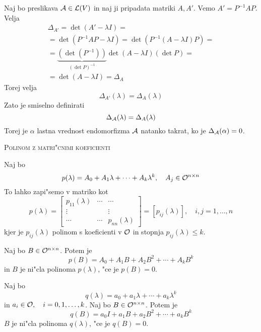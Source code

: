 Naj bo preslikava $\mathcal{A} \in \mathcal{L}(V)$ in naj ji pripadata matriki $A, A'$. Vemo $A' = P^{-1} AP$. Velja
\begin{multline*}
\Delta_{A'} = \det (A' - \lambda I) = \\
= \det (P^{-1} AP - \lambda I) = \det (P^{-1}(A - \lambda I)P) = \\
= \underbrace{(\det (P^{-1}))}_{(\det P)^{-1}} \det (A - \lambda I) (\det P) = \\
= \det (A - \lambda I) = \Delta_A
\end{multline*}
Torej velja
\begin{equation*}
\Delta_{A'}(\lambda) = \Delta_A(\lambda)
\end{equation*}
Zato je smiselno definirati
\begin{equation*}
\Delta_{\mathcal{A}}(\lambda) = \Delta_A(\lambda)
\end{equation*}
Torej je $\alpha$ lastna vrednost endomorfizma $\mathcal{A}$ natanko takrat, ko je $\Delta_{\mathcal{A}}(\alpha) = 0$.

\textsc{Polinom z matri"cnimi koeficienti}

Naj bo
\begin{equation*}
p(\lambda) = A_0 + A_1 \lambda + \cdots + A_k \lambda^k, \quad A_j \in \mathcal{O}^{n \times n}
\end{equation*}
To lahko zapi"semo v matriko kot
\begin{equation*}
p(\lambda) = \begin{bmatrix}
p_{11}(\lambda) & \cdots & \cdots \\
\vdots & & \vdots \\
\cdots & \cdots & p_{nn} (\lambda)
\end{bmatrix} = [p_{ij}(\lambda)], \quad i, j = 1, \ldots, n
\end{equation*}
kjer je $p_{ij}(\lambda)$ polinom s koeficienti v $\mathcal{O}$ in stopnja $p_{ij}(\lambda) \leq k$.

Naj bo $B \in \mathcal{O}^{n \times n}$. Potem je
\begin{equation*}
p(B) = A_0 + A_1 B + A_2 B^2 + \cdots + A_k B^k
\end{equation*}
in $B$ je ni"cla polinoma $p(\lambda)$, "ce je $p(B) = 0$.

Naj bo
\begin{equation*}
q(\lambda) = a_0 + a_1 \lambda + \cdots + a_k \lambda^k
\end{equation*}
in $a_i \in \mathcal{O}, \quad i = 0, 1, \ldots, k$. Naj bo $B \in \mathcal{O}^{n \times n}$. Potem je
\begin{equation*}
q(B) = a_0 I + a_1 B + a_2 B^2 + \cdots + a_k B^k
\end{equation*}
$B$ je ni"cla polinoma $q(\lambda)$, "ce je $q(B) = 0$.

